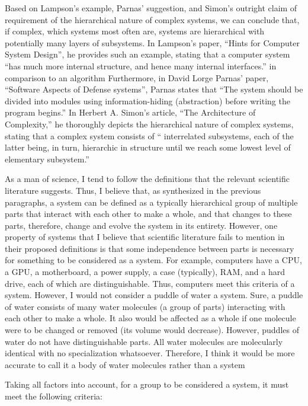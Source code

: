\documentclass[11pt]{article}
\begin{document}
\par Based on Lampson's example, Parnas' suggestion, and Simon's outright claim of requirement of the hierarchical nature of complex systems, we can conclude that, if complex, which systems most often are, systems are hierarchical with potentially many layers of subsystems. In Lampson's paper, ``Hints for Computer System Design'', he provides such an example, stating that a computer system ``has much more internal structure, and hence many internal interfaces.'' in comparison to an algorithm\cite{lampson:1983} Furthermore, in David Lorge Parnas' paper, ``Software Aspects of Defense systems'', Parnas states that ``The system should be divided into modules using information-hiding (abstraction) before writing the program begins.''\cite{parnas:1985} In Herbert A. Simon's article, ``The Architecture of Complexity,'' he thoroughly depicts the hierarchical nature of complex systems, stating that a complex system consists of `` interrelated subsystems, each of the latter being, in turn, hierarchic in structure until we reach some lowest level of elementary subsystem.'' \cite{simon:1962}
\par As a man of science, I tend to follow the definitions that the relevant scientific literature suggests. Thus, I believe that, as synthesized in the previous paragraphs, a system can be defined as a typically hierarchical group of multiple parts that interact with each other to make a whole, and that changes to these parts, therefore, change and evolve the system in its entirety. However, one property of systems that I believe that scientific literature fails to mention in their proposed definitions is that some independence between parts is necessary for something to be considered as a system. For example, computers have a CPU, a GPU, a motherboard, a power supply, a case (typically), RAM, and a hard drive, each of which are distinguishable. Thus, computers meet this criteria of a system. However, I would not consider a puddle of water a system. Sure, a puddle of water consists of many water molecules (a group of parts) interacting with each other to make a whole. It also would be affected as a whole if one molecule were to be changed or removed (its volume would decrease). However, puddles of water do not have distinguishable parts. All water molecules are molecularly identical with no specialization whatsoever. Therefore, I think it would be more accurate to call it a body of water molecules rather than a system
\par Taking all factors into account, for a group to be considered a system, it must meet the following criteria:
\end{document}
